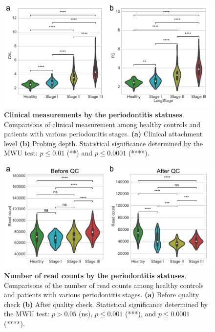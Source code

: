 \documentclass[11pt, a4paper, onecolumn, oneside]{report}
\begin{document}
            \begin{figure}[p]
                \centering
                \includegraphics[width=\linewidth]{Figures/Periodontitis/Figure_R02.pdf}
                \caption[Clinical measurements by the periodontitis statuses]{\textbf{Clinical measurements by the periodontitis statuses}. \\
                    Comparisons of clinical measurement among healthy controls and patients with various periodontitis stages. \textbf{(a)} Clinical attachment level \textbf{(b)} Probing depth. Statistical significance determined by the MWU test: $p \le 0.01$ (**) and $p \le 0.0001$ (****).}
                \label{fig:Periodontitis-clinical}
            \end{figure}
            \clearpage

            \begin{figure}[p]
                \centering
                \includegraphics[width=\linewidth]{Figures/Periodontitis/Figure_R03.pdf}
                \caption[Number of read counts by the periodontitis statuses]{\textbf{Number of read counts by the periodontitis statuses}. \\
                    Comparisons of the number of read counts among healthy controls and patients with various periodontitis stages. \textbf{(a)} Before quality check \textbf{(b)} After quality check. Statistical significance determined by the MWU test: $p > 0.05$ (ns), $p \le 0.001$ (***), and $p \le 0.0001$ (****).}
                \label{fig:Periodontitis-QC}
            \end{figure}
            \clearpage
\end{document}
